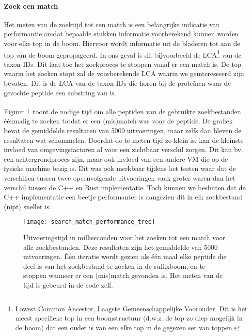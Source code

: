 \paragraph{Zoek een match}
Het meten van de zoektijd tot een match is een belangrijke indicatie van performantie omdat bepaalde stukken informatie voorberekend kunnen worden voor elke top in de boom.
Hiervoor wordt informatie uit de bladeren tot aan de top van de boom gepropageerd.
In ons geval is dit bijvoorbeeld de LCA\footnote{Lowest Common Ancestor, Laagste Gemeenschappelijke Voorouder. Dit is het meest specifieke top in een boomstructuur (d.w.z. de top zo diep mogelijk in de boom) dat een ouder is van een elke top in de gegeven set van toppen.\label{footnote:lca}} van de taxon IDs.
Dit laat toe het zoekproces te stoppen vanaf er een match is.
De top waarin het zoeken stopt zal de voorberekende LCA waarin we geïnteresseerd zijn bevaten.
Dit is de LCA van de taxon IDs die horen bij de proteïnen waar de gezochte peptide een substring van is.
\\ \\
Figuur~\ref{fig:performance_match_tree} toont de nodige tijd om alle peptiden van de gebruikte zoekbestanden éénmalig te zoeken totdat er een (mis)match was voor de peptide.
De grafiek bevat de gemiddelde resultaten van 5000 uitvoeringen, maar zelfs dan bleven de resultaten wat schommelen.
Doordat de te meten tijd zo klein is, kan de kleinste invloed van omgevingsfactoren al voor een zichtbaar verschil zorgen.
Dit kan bv. een achtergrondproces zijn, maar ook invloed van een andere VM die op de fysieke machine bezig is.
Dit was ook merkbaar tijdens het testen waar dat de verschillen tussen twee opeenvolgende uitvoeringen vaak groter waren dan het verschil tussen de C++ en Rust implementatie.
Toch kunnen we besluiten dat de C++ implementatie een beetje performanter is aangezien dit in elk zoekbestand (nipt) sneller is.

\begin{figure}[H]
    \centering
    \texttt{[image: search\_match\_performance\_tree]}
    \caption{Uitvoeringstijd in milliseconden voor het zoeken tot een match voor alle zoekbestanden. Deze resultaten zijn het gemiddelde van 5000 uitvoeringen. Één iteratie wordt gezien als één maal elke peptide die deel is van het zoekbestand te zoeken in de suffixboom, en te stoppen wanneer er een (mis)match gevonden is. Het meten van de tijd is gebeurd in de code zelf.}
    \label{fig:performance_match_tree}
\end{figure}

